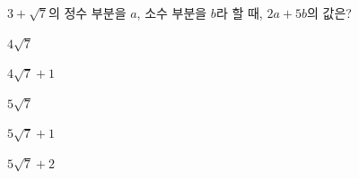 $3+\sqrt{7}$의 정수 부분을 $a$, 소수 부분을 $b$라 할 때, $2a+5b$의 값은?
\begin{choices32}{\rule[-3ex]{0pt}{8ex}$4\sqrt{7}$}{\rule[-3ex]{0pt}{8ex}$4\sqrt{7}+1$}{\rule[-3ex]{0pt}{8ex}$5\sqrt{7}$}{\rule[-3ex]{0pt}{8ex}$5\sqrt{7}+1$}{\rule[-3ex]{0pt}{8ex}$5\sqrt{7}+2$}\end{choices32}
